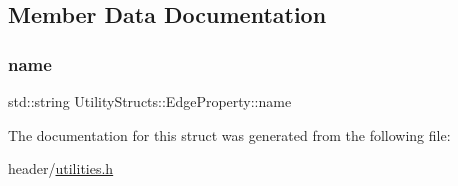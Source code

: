 \subsection{Member Data Documentation}
\mbox{\label{struct_utility_structs_1_1_edge_property_a0701d898f719b1efbf795d80f503de81_a0701d898f719b1efbf795d80f503de81}} 
\subsubsection{\texorpdfstring{name}{name}}
{\footnotesize\ttfamily std\+::string Utility\+Structs\+::\+Edge\+Property\+::name}



The documentation for this struct was generated from the following file\+:\begin{DoxyCompactItemize}
\item 
header/\hyperlink{utilities_8h}{utilities.\+h}\end{DoxyCompactItemize}
